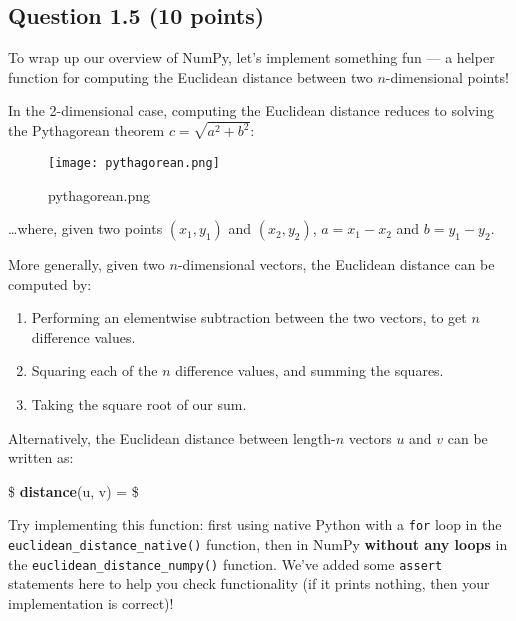 \documentclass[11pt]{article}
\providecommand{\tightlist}{%
      \setlength{\itemsep}{0pt}\setlength{\parskip}{0pt}}
\begin{document}
    \hypertarget{question-1.5-10-points}{%
\subsection{Question 1.5 (10 points)}\label{question-1.5-10-points}}

To wrap up our overview of NumPy, let's implement something fun --- a
helper function for computing the Euclidean distance between two
\(n\)-dimensional points!

In the 2-dimensional case, computing the Euclidean distance reduces to
solving the Pythagorean theorem \(c = \sqrt{a^2 + b^2}\):

\begin{figure}
\centering
\texttt{[image: pythagorean.png]}
\caption{pythagorean.png}
\end{figure}

\ldots where, given two points \((x_1, y_1)\) and \((x_2, y_2)\),
\(a = x_1 - x_2\) and \(b = y_1 - y_2\).

More generally, given two \(n\)-dimensional vectors, the Euclidean
distance can be computed by:

\begin{enumerate}
\def\labelenumi{\arabic{enumi}.}
\tightlist
\item
  Performing an elementwise subtraction between the two vectors, to get
  \(n\) difference values.
\item
  Squaring each of the \(n\) difference values, and summing the squares.
\item
  Taking the square root of our sum.
\end{enumerate}

Alternatively, the Euclidean distance between length-\(n\) vectors \(u\)
and \(v\) can be written as:

\$ \quad\textbf{distance}(u, v) =  \$

Try implementing this function: first using native Python with a
\texttt{for} loop in the \texttt{euclidean\_distance\_native()}
function, then in NumPy \textbf{without any loops} in the
\texttt{euclidean\_distance\_numpy()} function. We've added some
\texttt{assert} statements here to help you check functionality (if it
prints nothing, then your implementation is correct)!
\end{document}
